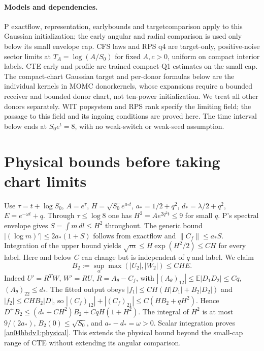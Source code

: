 \documentclass[11pt]{article}
\newcommand{\dd}{\,d}
\begin{document}
\paragraph{Models and dependencies.}
P exactflow, representation, earlybounds and targetcomparison apply
to this Gaussian initialization; the early angular and radial comparison
is used only below its small envelope cap. CFS laws and RPS q4 are
target-only, positive-noise sector limits at $T_A=\log(A/S_0)$ for
fixed $A,c>0$, uniform on compact interior labels. CTE early and profile
are trained compact-Q1 estimates on the small cap. The compact-chart
Gaussian target and per-donor formulas below are the individual kernels
in MOMC donorkernels, whose expansions require a bounded receiver and
bounded donor chart, not ten-power initialization. We treat all other
donors separately. WIT popsystem and RPS rank specify the limiting
field; the passage to this field and its ingoing conditions are proved
here. The time interval below ends at $S_0 e^t=8$, with no weak-switch
or weak-seed assumption.

\section{Physical bounds before taking chart limits}
Use $\tau=t+\log S_0$, $A=e^\tau$, $H=\sqrt{S_0}e^{a_*t}$,
$a_*=1/2+q^2$, $d_*=\lambda/2+q^2$, $E=e^{-\omega t}+q$.
Through $\tau\le\log8$ one has $H^2=Ae^{2q^2t}\le9$ for small $q$.
P's spectral envelope gives $S=\int m\dd l\le H^2$ throughout.
The generic bound $|(\log m)'|\le 2a_*(1+S)$ follows from exactflow
and $\|C_f\|\le a_*S$. Integration of the upper bound yields
$\sqrt m\le H\exp(H^2/2)\le C H$ for every label. Here and below
$C$ can change but is independent of $q$ and label. We claim
\begin{equation}\label{an04hbdv1:physical}
 B_2:=\sup_\alpha\max(|U_2|,|W_2|)\le C H E .
\end{equation}
Indeed $U'=R^TW$, $W'=RU$, $R=A_\theta-C_f$, with
$|(A_\theta)_{12}|\le\mathbb E|D_1D_2|\le Cq$,
$(A_\theta)_{22}\le d_*$. The fitted output obeys
$|f_1|\le CH(H|D_1|+B_2|D_2|)$ and $|f_2|\le CHB_2|D|$,
so $|(C_f)_{12}|+|(C_f)_{21}|\le C(HB_2+qH^2)$.
Hence $D^+B_2\le(d_*+CH^2)B_2+CqH(1+H^2)$.
The integral of $H^2$ is at most $9/(2a_*)$, $B_2(0)\le\sqrt{S_0}$,
and $a_*-d_*=\omega>0$. Scalar integration proves
\eqref{an04hbdv1:physical}. This extends the physical bound beyond
the small-cap range of CTE without extending its angular comparison.
\end{document}
